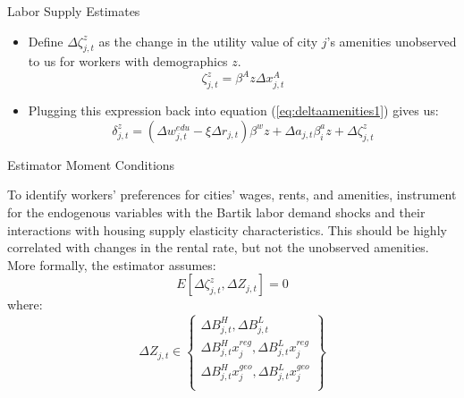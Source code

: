 \documentclass[aspectratio=169]{beamer}
\begin{document}

\begin{frame}{Labor Supply Estimates}

\begin{itemize}
    \item<1-> Define $ \Delta \zeta_{j,t}^{z} $ as the change in the utility value of city $ j $’s amenities unobserved to us for workers with demographics $ z $.
    \begin{equation*}
        \zeta_{j,t}^{z} = \beta^{A} z \Delta x_{j,t}^{A}
    \end{equation*}
    \item<2-> Plugging this expression back into equation (\ref{eq:deltaamenities1}) gives us:
    \begin{equation}
        \delta_{j,t}^{z} = \left( \Delta w_{j,t}^{edu} - \xi \Delta r_{j,t} \right) \beta^{w} z + \Delta a_{j,t} \beta_{i}^{a} z + \Delta \zeta_{j,t}^{z}
        \label{eq:deltaamenities2}
    \end{equation}
\end{itemize}
    
\end{frame}


\begin{frame}{Estimator Moment Conditions}

To identify workers’ preferences for cities’ wages, rents, and amenities, instrument for the endogenous variables with the Bartik labor demand shocks and their interactions with housing supply elasticity characteristics.  This should be highly correlated with changes in the rental rate, but not the unobserved amenities.  More formally, the estimator assumes:
\begin{equation*}
    E\left[ \Delta \zeta_{j,t}^{z} , \Delta Z_{j,t} \right] = 0
\end{equation*}
where:
\begin{equation*}
    \Delta Z_{j,t} \in \left\{ \begin{matrix}
            \Delta B_{j,t}^{H} , \Delta B_{j,t}^{L} \\
            \Delta B_{j,t}^{H} x_{j}^{reg} , \Delta B_{j,t}^{L} x_{j}^{reg} \\
            \Delta B_{j,t}^{H} x_{j}^{geo} , \Delta B_{j,t}^{L} x_{j}^{geo} \\
        \end{matrix} \right\}
\end{equation*}
    
\end{frame}
\end{document}
